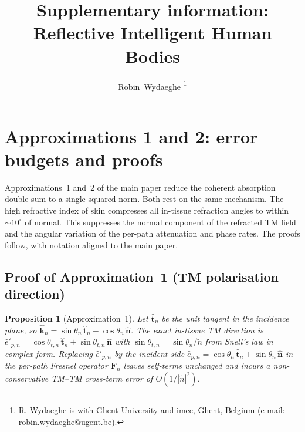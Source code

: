 \documentclass[10pt,journal,twocolumn]{IEEEtran}
\title{Supplementary information:\\
Reflective Intelligent Human Bodies}
\author{Robin~Wydaeghe%
  \thanks{R. Wydaeghe is with Ghent University and imec, Ghent, Belgium
  (e-mail: robin.wydaeghe@ugent.be).}}
\newcommand{\nhat}{\hat{\bm{n}}}
\newcommand{\Fn}{\mathbf{F}_n}
\newcommand{\ntilde}{\tilde{n}}
\theoremstyle{plain}
\newtheorem{proposition}{Proposition}[section]
\theoremstyle{definition}
\begin{document}
\maketitle

\section{Approximations 1 and 2: error budgets and proofs}\label{si:approx-proofs}

Approximations~1 and~2 of the main paper reduce the coherent absorption
double sum to a single squared norm. Both rest on the same mechanism.
The high refractive index of skin compresses all in-tissue refraction
angles to within $\sim\!10^{\circ}$ of normal. This suppresses the
normal component of the refracted TM field and the angular variation
of the per-path attenuation and phase rates. The proofs follow,
with notation aligned to the main paper.

\subsection{Proof of Approximation~1 (TM polarisation direction)}

\begin{proposition}[Approximation~1]\label{prop:S-approx1}
Let $\hat{\bm{t}}_n$ be the unit tangent in the incidence plane, so
$\hat{\bm{k}}_n = \sin\theta_n\,\hat{\bm{t}}_n - \cos\theta_n\,\nhat$.
The exact in-tissue TM direction is $\hat{e}'_{p,n} =
\cos\theta_{t,n}\,\hat{\bm{t}}_n + \sin\theta_{t,n}\,\nhat$ with
$\sin\theta_{t,n} = \sin\theta_n / \ntilde$ from Snell's law in
complex form. Replacing $\hat{e}'_{p,n}$ by the incident-side
$\hat{e}_{p,n} = \cos\theta_n\,\hat{\bm{t}}_n + \sin\theta_n\,\nhat$
in the per-path Fresnel operator $\Fn$ leaves self-terms unchanged
and incurs a non-conservative TM--TM cross-term error of
$O(1/|\ntilde|^2)$.
\end{proposition}
\end{document}
